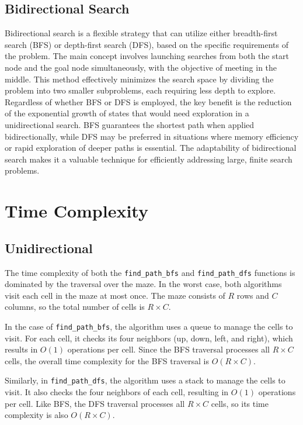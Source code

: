 \documentclass[final, journal, 11pt]{report}
\begin{document}
	\subsection*{Bidirectional Search}
	Bidirectional search is a flexible strategy that can utilize either breadth-first search (BFS) or depth-first search (DFS), based on the specific requirements of the problem. The main concept involves launching searches from both the start node and the goal node simultaneously, with the objective of meeting in the middle. This method effectively minimizes the search space by dividing the problem into two smaller subproblems, each requiring less depth to explore. Regardless of whether BFS or DFS is employed, the key benefit is the reduction of the exponential growth of states that would need exploration in a unidirectional search. BFS guarantees the shortest path when applied bidirectionally, while DFS may be preferred in situations where memory efficiency or rapid exploration of deeper paths is essential. The adaptability of bidirectional search makes it a valuable technique for efficiently addressing large, finite search problems.
	
	\section*{Time Complexity}
	
	\subsection*{Unidirectional}
	The time complexity of both the \texttt{find\_path\_bfs} and \texttt{find\_path\_dfs} functions is dominated by the traversal over the maze. In the worst case, both algorithms visit each cell in the maze at most once. The maze consists of \( R \) rows and \( C \) columns, so the total number of cells is \( R \times C \).
	
	In the case of \texttt{find\_path\_bfs}, the algorithm uses a queue to manage the cells to visit. For each cell, it checks its four neighbors (up, down, left, and right), which results in \( O(1) \) operations per cell. Since the BFS traversal processes all \( R \times C \) cells, the overall time complexity for the BFS traversal is \( O(R \times C) \).
	
	Similarly, in \texttt{find\_path\_dfs}, the algorithm uses a stack to manage the cells to visit. It also checks the four neighbors of each cell, resulting in \( O(1) \) operations per cell. Like BFS, the DFS traversal processes all \( R \times C \) cells, so its time complexity is also \( O(R \times C) \).
	
\end{document}

